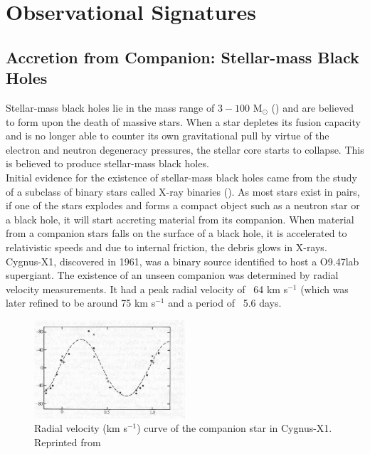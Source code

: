 \documentclass[twocolumn]{aastex63}
\begin{document}
\section{Observational Signatures}
\subsection{Accretion from Companion: Stellar-mass Black Holes}
Stellar-mass black holes lie in the mass range of $3-100$ M$_{\odot}$ (\cite{Capelo_2019}) and are believed to form upon the death of massive stars. When a star depletes its fusion capacity and is no longer able to counter its own gravitational pull by virtue of the electron and neutron degeneracy pressures, the stellar core starts to collapse. This is believed to produce stellar-mass black holes.\\

Initial evidence for the existence of stellar-mass black holes came from the study of a subclass of binary stars called X-ray binaries (\cite{Casares_2006}). As most stars exist in pairs, if one of the stars explodes and forms a compact object such as a neutron star or a black hole, it will start accreting material from its companion. When material from a companion stars falls on the surface of a black hole, it is accelerated to relativistic speeds and due to internal friction, the debris glows in X-rays.\\ Cygnus-X1, discovered in 1961, was a binary source identified to host a O9.47lab supergiant. The existence of an unseen companion was determined by radial velocity measurements. 
It had a peak radial velocity of ~64 km s$^{-1}$ (which was later refined to be around 75 km s$^{-1}$ and a period of ~5.6 days.\\

\begin{figure}
    \includegraphics[width=0.5\textwidth]{cygx1_curves.png}
    \caption{Radial velocity (km s$^{-1}$) curve of the companion star in Cygnus-X1. Reprinted from \cite{1972Natur.235...37W}}
    \label{fig:cygx1_radial}
\end{figure}
\end{document}
